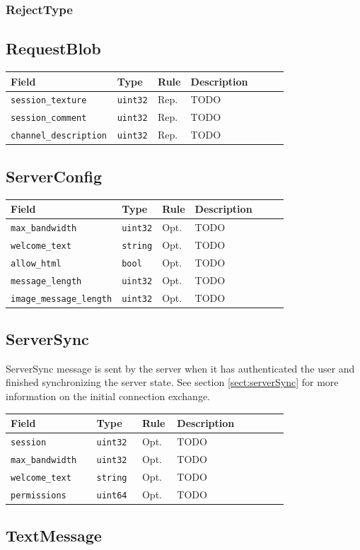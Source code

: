 \documentclass[11pt]{article} %
\newenvironment{mumbleMessageEx}
{%
	\small
	\renewcommand\arraystretch{1.5}
	\begin{tabular}{p{0.25\linewidth}p{0.13\linewidth}p{0.05\linewidth}p{0.35\linewidth}}
	Field & Type & Rule & Description \\
	\hline
}
{%
	\end{tabular}
	\renewcommand\arraystretch{1.0}
}
\newcommand{\mumbleMessageExItem}[4]{ \texttt{#1} & \texttt{#2} & #3 & #4 \\ }
\begin{document}
\subsubsection{RejectType}

\subsection{RequestBlob}

\begin{mumbleMessageEx}
\mumbleMessageExItem{session\_texture}{uint32}{Rep.}{TODO}
\mumbleMessageExItem{session\_comment}{uint32}{Rep.}{TODO}
\mumbleMessageExItem{channel\_description}{uint32}{Rep.}{TODO}
\end{mumbleMessageEx}

\subsection{ServerConfig}

\begin{mumbleMessageEx}
\mumbleMessageExItem{max\_bandwidth}{uint32}{Opt.}{TODO}
\mumbleMessageExItem{welcome\_text}{string}{Opt.}{TODO}
\mumbleMessageExItem{allow\_html}{bool}{Opt.}{TODO}
\mumbleMessageExItem{message\_length}{uint32}{Opt.}{TODO}
\mumbleMessageExItem{image\_message\_length}{uint32}{Opt.}{TODO}
\end{mumbleMessageEx}

\subsection{ServerSync}

ServerSync message is sent by the server when it has authenticated the user and finished synchronizing the server state. See section \ref{sect:serverSync} for more information on the initial connection exchange.

\begin{mumbleMessageEx}
\mumbleMessageExItem{session}{uint32}{Opt.}{TODO}
\mumbleMessageExItem{max\_bandwidth}{uint32}{Opt.}{TODO}
\mumbleMessageExItem{welcome\_text}{string}{Opt.}{TODO}
\mumbleMessageExItem{permissions}{uint64}{Opt.}{TODO}
\end{mumbleMessageEx}

\subsection{TextMessage}
\end{document}
